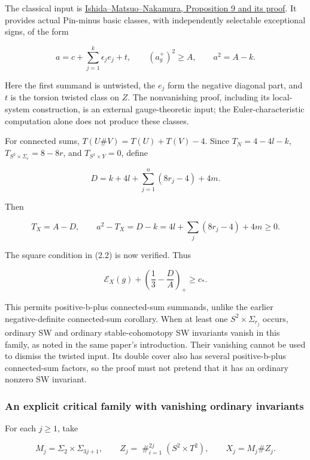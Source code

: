 \documentclass[
  10pt,
]{article}
\begin{document}
The classical input is
\href{https://arxiv.org/pdf/1505.05948}{Ishida--Matsuo--Nakamura,
Proposition 9 and its proof}. It provides actual Pin-minus basic
classes, with independently selectable exceptional signs, of the form

\[
 a=c+\sum_{j=1}^{k}\epsilon_j e_j+t,
 \qquad (a_g^+)^2\ge A,
 \qquad a^2=A-k.                                       \tag{3.2}
\]

Here the first summand is untwisted, the \(e_j\) form the negative
diagonal part, and \(t\) is the torsion twisted class on \(Z\). The
nonvanishing proof, including its local-system construction, is an
external gauge-theoretic input; the Euler-characteristic computation
alone does not produce these classes.

For connected sums, \(T(U\#V)=T(U)+T(V)-4\). Since \(T_N=4-4l-k\),
\(T_{S^2\times\Sigma_r}=8-8r\), and \(T_{S^1\times Y}=0\), define

\[
       D=k+4l+\sum_{j=1}^{n}(8r_j-4)+4m.
\]

Then

\[
 T_X=A-D,\qquad a^2-T_X=D-k
          =4l+\sum_j(8r_j-4)+4m\ge0.                   \tag{3.3}
\]

The square condition in (2.2) is now verified. Thus

\[
 \boxed{\displaystyle
 \mathcal E_X(g)+\left(\frac13-\frac DA\right)_+\ge c_* .}
                                                               \tag{3.4}
\]

This permits positive-b-plus connected-sum summands, unlike the earlier
negative-definite connected-sum corollary. When at least one
\(S^2\times\Sigma_{r_j}\) occurs, ordinary SW and ordinary
stable-cohomotopy SW invariants vanish in this family, as noted in the
same paper's introduction. Their vanishing cannot be used to dismiss the
twisted input. Its double cover also has several positive-b-plus
connected-sum factors, so the proof must not pretend that it has an
ordinary nonzero SW invariant.

\hypertarget{an-explicit-critical-family-with-vanishing-ordinary-invariants}{%
\subsubsection{An explicit critical family with vanishing ordinary
invariants}\label{an-explicit-critical-family-with-vanishing-ordinary-invariants}}

For each \(j\ge1\), take

\[
 M_j=\Sigma_2\times\Sigma_{3j+1},\qquad
 Z_j=\mathop{\#}_{i=1}^{2j}(S^2\times T^2),\qquad
 X_j=M_j\#Z_j.
\]
\end{document}
